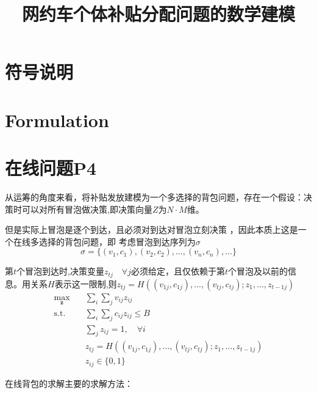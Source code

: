 \documentclass[12pt, a4paper]{article}
\title{\textbf{网约车个体补贴分配问题的数学建模}}
\begin{document}
\maketitle

\section{符号说明}


\section{Formulation}


\section{在线问题P4}
从运筹的角度来看，将补贴发放建模为一个多选择的背包问题，存在一个假设：决策时可以对所有冒泡做决策,即决策向量$Z$为$N\cdot M$维。\par
但是实际上冒泡是逐个到达，且必须对到达对冒泡立刻决策
，因此本质上这是一个在线多选择的背包问题，即
考虑冒泡到达序列为$\sigma$
$$\sigma = \{(v_1, c_1), (v_2, c_2), \dots, (v_n, c_n), \dots\}$$\par
第$t$个冒泡到达时,决策变量$z_{tj} \quad\forall j$必须给定，且仅依赖于第$t$个冒泡及以前的信息。用关系$H$表示这一限制,则$z_{tj}=H((v_{1j}, c_{1j}), \dots, (v_{tj}, c_{tj}); z_1, \dots, z_{{t-1}j})$
\begin{equation} \label{eq:omckp}
\begin{aligned}
\max_{\bm z} \quad &  \sum_{i}\sum_{j}v_{ij}z_{ij} \\
\text{s.t.} 
\quad 
& \sum_{i}\sum_{j} c_{ij} z_{ij} \le B  \\
& \sum_{j} z_{ij} = 1, \quad \forall i \\
&z_{tj} = H((v_{1j}, c_{1j}), \dots, (v_{tj}, c_{tj}); z_1, \dots, z_{{t-1}j})\\
& z_{ij} \in \{0, 1\}
\end{aligned}
\end{equation}\par
在线背包的求解主要的求解方法：
\end{document}
